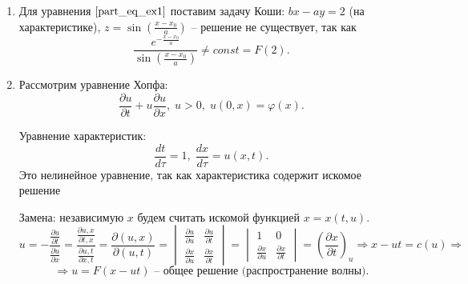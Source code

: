 \begin{enumerate}
    \item

    Для уравнения $\eqref{part_eq_ex1}$ поставим задачу Коши: $bx - ay = 2$ (на характеристике), $z = \sin (\frac{x - x_0}{a})$ -- решение не существует, так как 
    \begin{equation*}
        \frac{e^{-\frac{x - x_0}{a}}}{\sin \left( \frac{x - x_0}{a} \right)} \neq const = F(2).
    \end{equation*}

    \item Рассмотрим уравнение Хопфа:
    \begin{equation*}
        \frac{\partial u}{\partial t} + u \frac{\partial u}{\partial x}, \; u > 0, \; u(0, x) = \varphi(x).
    \end{equation*}

    Уравнение характеристик:
    \begin{equation*}
        \frac{dt}{d \tau} = 1, \; \frac{dx}{d \tau} = u(x, t).
    \end{equation*}
    \noindent  Это нелинейное уравнение, так как характеристика содержит искомое решение
    
    Замена: независимую $x$ будем считать искомой функцией $x = x(t, u)$.
    \begin{equation*}
        u = - \frac{\frac{\partial u}{\partial t}}{\frac{\partial u}{\partial x}}  = \frac{\frac{\partial u, x}{\partial t, x}}{\frac{\partial u, t}{\partial x, t}} = \frac{\partial (u, x)}{\partial (u, t)} = 
        \begin{vmatrix}
            \frac{\partial u}{\partial u} & \frac{\partial u}{\partial t} \\
            \frac{\partial x}{\partial u} & \frac{\partial x}{\partial t}
        \end{vmatrix} = 
        \begin{vmatrix}
            1 & 0 \\
            \frac{\partial x}{\partial u} & \frac{\partial x}{\partial t}
        \end{vmatrix} = \left( \frac{\partial x}{\partial t} \right)_{u} \Rightarrow x - ut = c(u) \Rightarrow 
    \end{equation*}
    \begin{equation*}
        \Rightarrow u = F(x - ut) \text{ -- общее решение (распространение волны)}.
    \end{equation*}
    
\end{enumerate}
